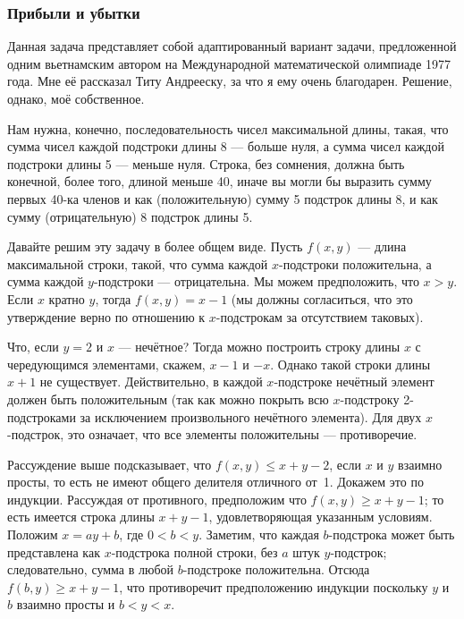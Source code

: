 \subsubsection*{Прибыли и убытки}%

Данная задача представляет собой адаптированный вариант задачи, предложенной одним вьетнамским автором на Международной математической олимпиаде 1977 года.
Мне её рассказал Титу Андрееску, %
за что я ему очень благодарен.
Решение, однако, моё собственное.

Нам нужна, конечно, последовательность чисел максимальной длины, такая, что сумма чисел каждой подстроки длины 8 --- больше нуля, а сумма чисел каждой подстроки длины 5 --- меньше нуля.
Строка, без сомнения, должна быть конечной, более того, длиной меньше 40, иначе вы могли бы выразить сумму первых 40-ка членов и как (положительную) сумму 5 подстрок длины 8, и как сумму (отрицательную) 8 подстрок длины 5.

Давайте решим эту задачу в более общем виде.
Пусть $f(x,y)$ --- длина максимальной строки, такой, что сумма каждой $x$-подстроки положительна, а сумма каждой $y$-подстроки --- отрицательна.
Мы можем предположить, что $x>y$.
Если $x$ кратно $y$, тогда $f(x,y)=x-1$ (мы должны согласиться, что это утверждение верно по отношению к $x$-подстрокам за отсутствием таковых).

Что, если $y=2$ и $x$ --- нечётное?
Тогда можно построить строку длины $x$ с чередующимся элементами, скажем, $x-1$ и $-x$.
Однако такой строки длины $x+1$ не существует.
Действительно, в каждой $x$-подстроке нечётный элемент должен быть положительным 
(так как можно покрыть всю $x$-подстроку 2-подстроками за исключением произвольного нечётного элемента).
Для двух $x$-подстрок, это означает, что все элементы положительны ---
противоречие.

Рассуждение выше подсказывает, что $f(x,y)\le x+y-2$, если $x$ и $y$ взаимно просты, 
то есть не имеют общего делителя отличного от~1.
Докажем это по индукции.
Рассуждая от противного, предположим что $f(x,y)\ge x+y-1$;
то есть имеется строка длины $x+y-1$, удовлетворяющая указанным условиям.
Положим $x=ay+b$, где $0<b<y$.
Заметим, что каждая $b$-подстрока %
может быть представлена как $x$-подстрока полной строки, 
без $a$ штук $y$-подстрок; 
следовательно, сумма в любой $b$-подстроке положительна.
Отсюда
$f(b,y)\ge x+y-1$,
что противоречит предположению индукции поскольку $y$ и $b$ взаимно просты и $b<y<x$.


